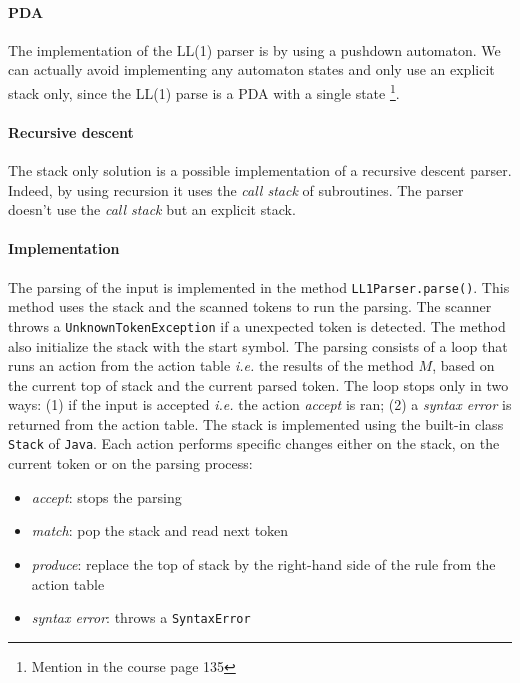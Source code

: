 \documentclass[letterpaper]{article}
\begin{document}
\label{implstack}

\paragraph{PDA}


The implementation of the LL(1) parser is by using a pushdown automaton.
We can actually avoid implementing any automaton states and only use
an explicit stack only, since the LL(1) parse is a PDA with a single state
\footnote{Mention in the course page 135}.

\paragraph{Recursive descent}

The stack only
solution is a possible implementation of a recursive descent parser. Indeed,
by using recursion it uses the \textit{call stack} of subroutines.
The parser doesn't use the \textit{call stack} but
an explicit stack.

\paragraph{Implementation}
The parsing of the input is implemented in the method
\texttt{LL1Parser.parse()}. This method uses the stack and the scanned tokens
to run the parsing. The scanner throws a \texttt{UnknownTokenException}
if a unexpected token is detected.
The method also initialize the stack with the start symbol. The parsing
consists of a loop that runs an action from the action table \textit{i.e.}
the results of the method $M$, based on
the current top of stack and the current parsed token. The loop stops only
in two ways: (1) if the input is accepted \textit{i.e.} the action
\textit{accept} is ran; (2) a \textit{syntax error} is returned from
the action table.
The stack is implemented using the built-in class
\texttt{Stack} of \texttt{Java}.
Each action performs specific changes either on the stack, on the current
token or on the parsing process:
\begin{itemize}
    \item \textit{accept}: stops the parsing
    \item \textit{match}: pop the stack and read next token
    \item \textit{produce}: replace the top of stack by the right-hand side
    of the rule from the action table
    \item \textit{syntax error}: throws a \texttt{SyntaxError}
\end{itemize}
\end{document}
